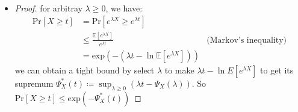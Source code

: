 \documentclass[12pt]{article}
\newenvironment{solution}[2][Solution]{\begin{trivlist}
\item[\hskip \labelsep {\bfseries #1}\hskip \labelsep {\bfseries #2.}]}{\end{trivlist}}
\begin{document}
\begin{solution}{2}
    ~
    \begin{itemize}
        \item \begin{proof}
        for arbitray $\lambda \ge 0$, we have:
            \begin{align*}
                \text{Pr}[X \ge t] &= \text{Pr}[e^{\lambda X} \ge e^{\lambda t}] \\
                & \le \frac{\mathbb{E}[e^{\lambda X}]}{e^{\lambda t}} &\text{(Markov's inequality)} \\
                & = \text{exp}(-(\lambda t - \ln \mathbb{E}[e^{\lambda X}]))
            \end{align*}
        we can obtain a tight bound by select $\lambda$ to make $\lambda t - \ln E[e^{\lambda X}]$ 
        to get its supremum $\Psi_X^*(t) \coloneqq \sup_{\lambda \ge 0}(\lambda t - \Psi_X(\lambda))$.
        So $\text{Pr}[X \ge t] \le \text{exp}(-\Psi_X^*(t))$


\end{proof}
\end{itemize}
\end{solution}
\end{document}
